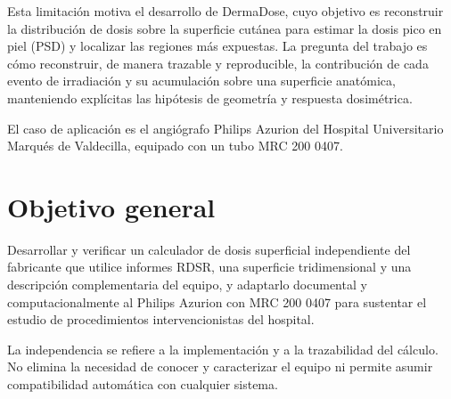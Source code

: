 Esta limitación motiva el desarrollo de DermaDose, cuyo objetivo es reconstruir la distribución de dosis sobre la superficie cutánea para estimar la dosis pico en piel (PSD) y localizar las regiones más expuestas. La pregunta del trabajo es cómo reconstruir, de manera trazable y reproducible, la contribución de cada evento de irradiación y su acumulación sobre una superficie anatómica, manteniendo explícitas las hipótesis de geometría y respuesta dosimétrica.

El caso de aplicación es el angiógrafo Philips Azurion del Hospital Universitario Marqués de Valdecilla, equipado con un tubo MRC 200 0407.
\section{Objetivo general}
Desarrollar y verificar un calculador de dosis superficial independiente del fabricante que utilice informes RDSR, una superficie tridimensional y una descripción complementaria del equipo, y adaptarlo documental y computacionalmente al Philips Azurion con MRC 200 0407 para sustentar el estudio de procedimientos intervencionistas del hospital.

La independencia se refiere a la implementación y a la trazabilidad del cálculo. No elimina la necesidad de conocer y caracterizar el equipo ni permite asumir compatibilidad automática con cualquier sistema.

